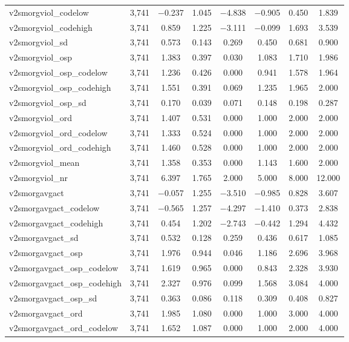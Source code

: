 \begin{table}[!htbp]
\begin{tabular}{@{\extracolsep{5pt}}lccccccc}
v2smorgviol\_codelow & 3,741 & $-$0.237 & 1.045 & $-$4.838 & $-$0.905 & 0.450 & 1.839 \\ 
v2smorgviol\_codehigh & 3,741 & 0.859 & 1.225 & $-$3.111 & $-$0.099 & 1.693 & 3.539 \\ 
v2smorgviol\_sd & 3,741 & 0.573 & 0.143 & 0.269 & 0.450 & 0.681 & 0.900 \\ 
v2smorgviol\_osp & 3,741 & 1.383 & 0.397 & 0.030 & 1.083 & 1.710 & 1.986 \\ 
v2smorgviol\_osp\_codelow & 3,741 & 1.236 & 0.426 & 0.000 & 0.941 & 1.578 & 1.964 \\ 
v2smorgviol\_osp\_codehigh & 3,741 & 1.551 & 0.391 & 0.069 & 1.235 & 1.965 & 2.000 \\ 
v2smorgviol\_osp\_sd & 3,741 & 0.170 & 0.039 & 0.071 & 0.148 & 0.198 & 0.287 \\ 
v2smorgviol\_ord & 3,741 & 1.407 & 0.531 & 0.000 & 1.000 & 2.000 & 2.000 \\ 
v2smorgviol\_ord\_codelow & 3,741 & 1.333 & 0.524 & 0.000 & 1.000 & 2.000 & 2.000 \\ 
v2smorgviol\_ord\_codehigh & 3,741 & 1.460 & 0.528 & 0.000 & 1.000 & 2.000 & 2.000 \\ 
v2smorgviol\_mean & 3,741 & 1.358 & 0.353 & 0.000 & 1.143 & 1.600 & 2.000 \\ 
v2smorgviol\_nr & 3,741 & 6.397 & 1.765 & 2.000 & 5.000 & 8.000 & 12.000 \\ 
v2smorgavgact & 3,741 & $-$0.057 & 1.255 & $-$3.510 & $-$0.985 & 0.828 & 3.607 \\ 
v2smorgavgact\_codelow & 3,741 & $-$0.565 & 1.257 & $-$4.297 & $-$1.410 & 0.373 & 2.838 \\ 
v2smorgavgact\_codehigh & 3,741 & 0.454 & 1.202 & $-$2.743 & $-$0.442 & 1.294 & 4.432 \\ 
v2smorgavgact\_sd & 3,741 & 0.532 & 0.128 & 0.259 & 0.436 & 0.617 & 1.085 \\ 
v2smorgavgact\_osp & 3,741 & 1.976 & 0.944 & 0.046 & 1.186 & 2.696 & 3.968 \\ 
v2smorgavgact\_osp\_codelow & 3,741 & 1.619 & 0.965 & 0.000 & 0.843 & 2.328 & 3.930 \\ 
v2smorgavgact\_osp\_codehigh & 3,741 & 2.327 & 0.976 & 0.099 & 1.568 & 3.084 & 4.000 \\ 
v2smorgavgact\_osp\_sd & 3,741 & 0.363 & 0.086 & 0.118 & 0.309 & 0.408 & 0.827 \\ 
v2smorgavgact\_ord & 3,741 & 1.985 & 1.080 & 0.000 & 1.000 & 3.000 & 4.000 \\ 
v2smorgavgact\_ord\_codelow & 3,741 & 1.652 & 1.087 & 0.000 & 1.000 & 2.000 & 4.000 \\ 

\end{tabular}
\end{table}
